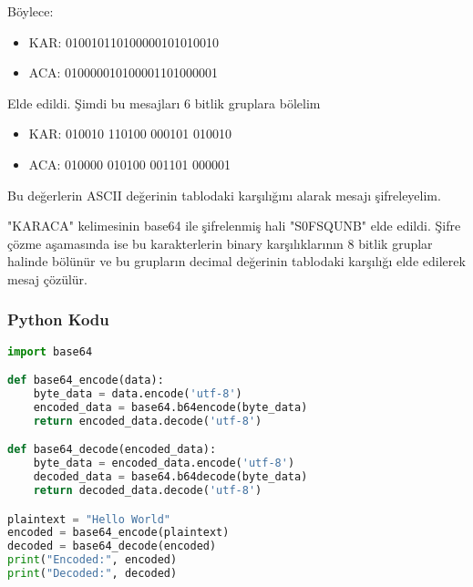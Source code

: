 Böylece:

\begin{itemize}
    \item KAR: 010010110100000101010010
    \item ACA: 010000010100001101000001
\end{itemize}

Elde edildi. Şimdi bu mesajları 6 bitlik gruplara bölelim

\begin{itemize}
    \item KAR: 010010 110100 000101 010010
    \item ACA: 010000 010100 001101 000001
\end{itemize}

Bu değerlerin ASCII değerinin tablodaki karşılığını alarak mesajı şifreleyelim.

\begin{table}[ht]
\centering
{}
\end{table}

"KARACA" kelimesinin base64 ile şifrelenmiş hali "S0FSQUNB" elde edildi. Şifre çözme aşamasında ise bu karakterlerin binary karşılıklarının 8 bitlik gruplar halinde bölünür ve bu grupların decimal değerinin tablodaki karşılığı elde edilerek mesaj çözülür.

\subsubsection{Python Kodu}

\begin{lstlisting}[language=Python]
import base64

def base64_encode(data):
    byte_data = data.encode('utf-8')
    encoded_data = base64.b64encode(byte_data)
    return encoded_data.decode('utf-8')

def base64_decode(encoded_data):
    byte_data = encoded_data.encode('utf-8')
    decoded_data = base64.b64decode(byte_data)
    return decoded_data.decode('utf-8')

plaintext = "Hello World"
encoded = base64_encode(plaintext)
decoded = base64_decode(encoded)
print("Encoded:", encoded)
print("Decoded:", decoded)
\end{lstlisting}

